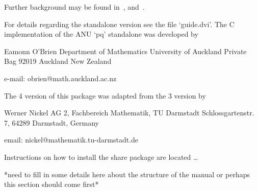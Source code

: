 \endlist

Further   background   may   be   found   in~\cite{OBr95},   \cite{Vau84}
and~\cite{NNN98}.

For details regarding the standalone version see  the  file  `guide.dvi'.
The C implementation of the ANU `pq' standalone was developed by

\begintt
Eamonn O'Brien
Department of Mathematics
University of Auckland
Private Bag 92019
Auckland
New Zealand

e-mail: obrien@math.auckland.ac.nz 
\endtt

The {\GAP} 4 version of this package was adapted from the {\GAP} 3
version by  

\begintt
Werner Nickel
AG 2, Fachbereich Mathematik, TU Darmstadt
Schlossgartenstr. 7, 64289 Darmstadt, Germany

email: nickel@mathematik.tu-darmstadt.de
\endtt


Instructions on how to install the {\ANUPQ} share package are located
\dots

*need to fill in some details here about the structure of the manual
 or perhaps this section should come first*

